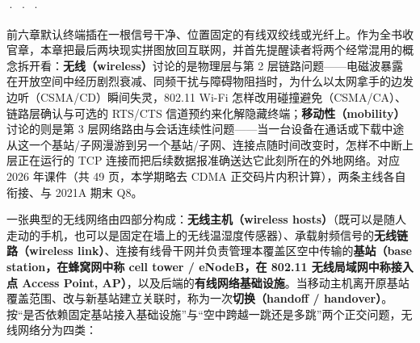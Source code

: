 

 ·  ·  · 


前六章默认终端插在一根信号干净、位置固定的有线双绞线或光纤上。作为全书收官章，本章把最后两块现实拼图放回互联网，并首先提醒读者将两个经常混用的概念拆开看：\textbf{无线（wireless）}讨论的是物理层与第 2 层链路问题——电磁波暴露在开放空间中经历剧烈衰减、同频干扰与障碍物阻挡时，为什么以太网拿手的边发边听（CSMA/CD）瞬间失灵，802.11 Wi-Fi 怎样改用碰撞避免（CSMA/CA）、链路层确认与可选的 RTS/CTS 信道预约来化解隐藏终端；\textbf{移动性（mobility）}讨论的则是第 3 层网络路由与会话连续性问题——当一台设备在通话或下载中途从这一个基站/子网漫游到另一个基站/子网、连接点随时间改变时，怎样不中断上层正在运行的 TCP 连接而把后续数据报准确送达它此刻所在的外地网络。对应 2026 年课件（共 49 页，本学期略去 CDMA 正交码片内积计算），两条主线各自衔接、与 2021A 期末 Q8。



一张典型的无线网络由四部分构成：\textbf{无线主机（wireless hosts）}（既可以是随人走动的手机，也可以是固定在墙上的无线温湿度传感器）、承载射频信号的\textbf{无线链路（wireless link）}、连接有线骨干网并负责管理本覆盖区空中传输的\textbf{基站（base station，在蜂窝网中称 cell tower / eNodeB，在 802.11 无线局域网中称接入点 Access Point, AP）}，以及后端的\textbf{有线网络基础设施}。当移动主机离开原基站覆盖范围、改与新基站建立关联时，称为一次\textbf{切换（handoff / handover）}。按“是否依赖固定基站接入基础设施”与“空中跨越一跳还是多跳”两个正交问题，无线网络分为四类：

